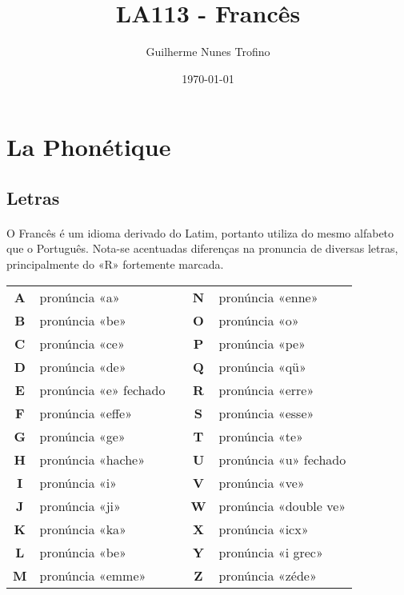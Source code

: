 \documentclass{article}
\title{LA113 - Francês}
\author{Guilherme Nunes Trofino}
\date{\today}
\begin{document}
    \maketitle
\newpage

    \tableofcontents
\newpage


\section{La Phonétique}
    \subsection{Letras}
        \paragraph{}O Francês é um idioma derivado do Latim, portanto utiliza do mesmo alfabeto que o Português. Nota-se acentuadas diferenças na pronuncia de diversas letras, principalmente do «R» fortemente marcada.
            
        \begin{center}
            \begin{tabular}{c  l  c  c  l}
                \textbf{A} & pronúncia «a»         &  & \textbf{N} & pronúncia «enne»\\
                \textbf{B} & pronúncia «be»        &  & \textbf{O} & pronúncia «o»\\
                \textbf{C} & pronúncia «ce»        &  & \textbf{P} & pronúncia «pe»\\
                \textbf{D} & pronúncia «de»        &  & \textbf{Q} & pronúncia «qü»\\
                \textbf{E} & pronúncia «e» fechado &  & \textbf{R} & pronúncia «erre»\\
                \textbf{F} & pronúncia «effe»      &  & \textbf{S} & pronúncia «esse»\\
                \textbf{G} & pronúncia «ge»        &  & \textbf{T} & pronúncia «te»\\
                \textbf{H} & pronúncia «hache»     &  & \textbf{U} & pronúncia «u» fechado\\
                \textbf{I} & pronúncia «i»         &  & \textbf{V} & pronúncia «ve»\\
                \textbf{J} & pronúncia «ji»        &  & \textbf{W} & pronúncia «double ve»\\
                \textbf{K} & pronúncia «ka»        &  & \textbf{X} & pronúncia «icx»\\
                \textbf{L} & pronúncia «be»        &  & \textbf{Y} & pronúncia «i grec»\\
                \textbf{M} & pronúncia «emme»      &  & \textbf{Z} & pronúncia «zéde»\\
            \end{tabular}
        \end{center}
        
\end{document}
